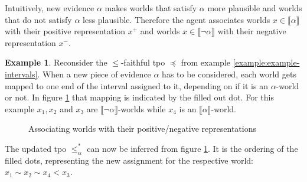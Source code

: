 \documentclass[english, 12pt]{scrartcl}
\theoremstyle{definition}
\newtheorem{example}{Example}
\theoremstyle{definition}
\theoremstyle{definition}
\newcommand{\modelsOf}[1]{\llbracket #1 \rrbracket}
\begin{document}
Intuitively, new evidence $\alpha$ makes worlds that satisfy $\alpha$ more plausible and worlds that do not satisfy $\alpha$ less plausible. Therefore the agent associates worlds $x \in \modelsOf{\alpha}$ with their positive representation $x^{+}$ and worlds $x \in \modelsOf{\neg\alpha}$ with their negative representation $x^{-}$.

\begin{example}
    \label{example:example-updated-tpo}
    Reconsider the $\leq$-faithful tpo $\preceq$ from example \ref{example:example-intervals}. When a new piece of evidence $\alpha$ has to be considered, each world gets mapped to one end of the interval assigned to it, depending on if it is an $\alpha$-world or not. In figure \ref{fig:example-updated-tpo} that mapping is indicated by the filled out dot. For this example $x_{1}, x_{2}$ and $x_{3}$ are $\modelsOf{\neg\alpha}$-worlds while $x_{4}$ is an $\modelsOf{\alpha}$-world.

    \begin{figure}[H]
        \centering
        \caption{Associating worlds with their positive/negative representations}
        \label{fig:example-updated-tpo}
    \end{figure}
    
    The updated tpo $\leq_{\alpha}^{\ast}$ can now be inferred from figure \ref{fig:example-updated-tpo}. It is the ordering of the filled dots, representing the new assignment for the respective world: $x_{1} \sim x_{2} \sim x_{4} < x_{3}$.
\end{example}
\end{document}
